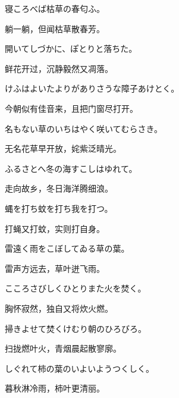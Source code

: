 \begin{haiku}
    {\FH 寝ころべば枯草の春匂ふ。}

    {\FK 躺一躺，但闻枯草散春芳。}
\end{haiku}

\begin{haiku}
    {\FH 開いてしづかに、ぽとりと落ちた。}

    {\FK 鲜花开过，沉静毅然又凋落。}
\end{haiku}

\begin{haiku}
    {\FH けふはよいたよりがありさうな障子あけとく。}

    {\FK 今朝似有佳音来，且把门窗尽打开。}
\end{haiku}

\begin{haiku}
    {\FH 名もない草のいちはやく咲いてむらさき。}

    {\FK 无名花草早开放，姹紫泛晴光。}
\end{haiku}

\begin{haiku}
    {\FH ふるさとへ冬の海すこしはゆれて。}

    {\FK 走向故乡，冬日海洋腾细浪。}
\end{haiku}

\begin{haiku}
    {\FH 蝿を打ち蚊を打ち我を打つ。}

    {\FK 打蝇又打蚊，实则打自身。}
\end{haiku}

\begin{haiku}
    {\FH 雷遠く雨をこぼしてゐる草の葉。}

    {\FK 雷声方远去，草叶迸飞雨。}
\end{haiku}

\begin{haiku}
    {\FH こころさびしくひとりまた火を焚く。}

    {\FK 胸怀寂然，独自又将炊火燃。}
\end{haiku}

\begin{haiku}
    {\FH 掃きよせて焚くけむり朝のひろびろ。}

    {\FK 扫拢燃叶火，青烟晨起散寥廓。}
\end{haiku}

\begin{haiku}
    {\FH しぐれて柿の葉のいよいようつくしく。}

    {\FK 暮秋淋冷雨，柿叶更清丽。}
\end{haiku}

